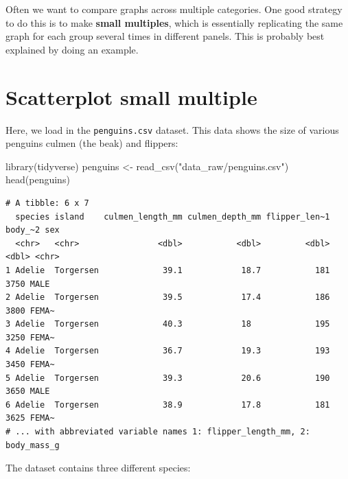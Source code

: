\documentclass[
  letterpaper,
  DIV=11,
  numbers=noendperiod]{scrreprt}
\newenvironment{Shaded}{\begin{snugshade}}{\end{snugshade}}
\newcommand{\FunctionTok}[1]{\textcolor[rgb]{0.28,0.35,0.67}{#1}}
\newcommand{\NormalTok}[1]{\textcolor[rgb]{0.00,0.23,0.31}{#1}}
\newcommand{\OtherTok}[1]{\textcolor[rgb]{0.00,0.23,0.31}{#1}}
\newcommand{\SpecialCharTok}[1]{\textcolor[rgb]{0.37,0.37,0.37}{#1}}
\newcommand{\StringTok}[1]{\textcolor[rgb]{0.13,0.47,0.30}{#1}}
\begin{document}
Often we want to compare graphs across multiple categories. One good
strategy to do this is to make \textbf{small multiples}, which is
essentially replicating the same graph for each group several times in
different panels. This is probably best explained by doing an example.

\hypertarget{scatterplot-small-multiple}{%
\section{\texorpdfstring{\textbf{Scatterplot small
multiple}}{Scatterplot small multiple}}\label{scatterplot-small-multiple}}

Here, we load in the \texttt{penguins.csv} dataset. This data shows the
size of various penguins culmen (the beak) and flippers:

\begin{Shaded}
\begin{Highlighting}[]
\FunctionTok{library}\NormalTok{(tidyverse)}
\NormalTok{penguins }\OtherTok{\textless{}{-}} \FunctionTok{read\_csv}\NormalTok{(}\StringTok{"data\_raw/penguins.csv"}\NormalTok{)}
\FunctionTok{head}\NormalTok{(penguins)}
\end{Highlighting}
\end{Shaded}

\begin{verbatim}
# A tibble: 6 x 7
  species island    culmen_length_mm culmen_depth_mm flipper_len~1 body_~2 sex  
  <chr>   <chr>                <dbl>           <dbl>         <dbl>   <dbl> <chr>
1 Adelie  Torgersen             39.1            18.7           181    3750 MALE 
2 Adelie  Torgersen             39.5            17.4           186    3800 FEMA~
3 Adelie  Torgersen             40.3            18             195    3250 FEMA~
4 Adelie  Torgersen             36.7            19.3           193    3450 FEMA~
5 Adelie  Torgersen             39.3            20.6           190    3650 MALE 
6 Adelie  Torgersen             38.9            17.8           181    3625 FEMA~
# ... with abbreviated variable names 1: flipper_length_mm, 2: body_mass_g
\end{verbatim}

The dataset contains three different species:

\begin{Shaded}
\end{Shaded}
\end{document}
